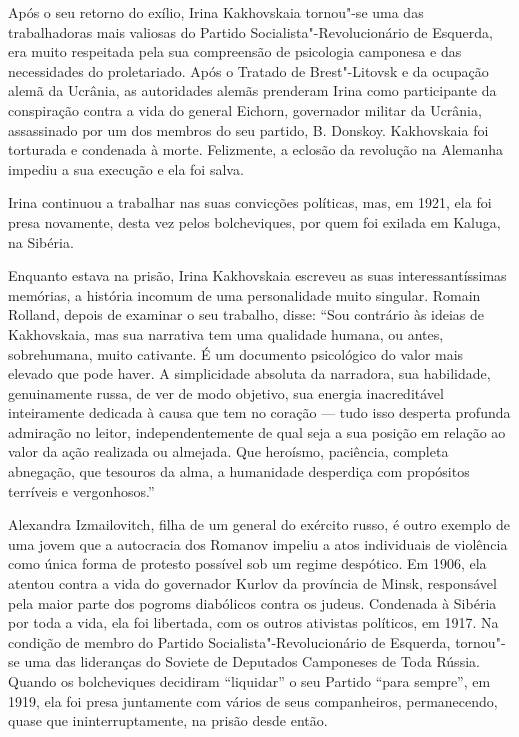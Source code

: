 Após o seu retorno do exílio, Irina Kakhovskaia tornou"-se uma das
trabalhadoras mais valiosas do Partido Socialista"-Revolucionário de
Esquerda, era muito respeitada pela sua compreensão de psicologia
camponesa e das necessidades do proletariado. Após o Tratado de
Brest"-Litovsk e da ocupação alemã da Ucrânia, as autoridades alemãs
prenderam Irina como participante da conspiração contra a vida do
general Eichorn, governador militar da Ucrânia, assassinado por um
dos membros do seu partido, B. Donskoy. Kakhovskaia foi torturada e
condenada à morte. Felizmente, a eclosão da revolução na Alemanha
impediu a sua execução e ela foi salva.

Irina continuou a trabalhar nas suas convicções políticas, mas, em 1921,
ela foi presa novamente, desta vez pelos bolcheviques, por quem foi
exilada em Kaluga, na Sibéria.

Enquanto estava na prisão, Irina Kakhovskaia escreveu as suas
interessantíssimas memórias, a história incomum de uma personalidade
muito singular. Romain Rolland, depois de examinar o seu trabalho,
disse: ``Sou contrário às ideias de Kakhovskaia, mas sua narrativa tem
uma qualidade humana, ou antes, sobrehumana, muito cativante. É um
documento psicológico do valor mais elevado que pode haver. A
simplicidade absoluta da narradora, sua habilidade, genuinamente russa,
de ver de modo objetivo, sua energia inacreditável inteiramente dedicada
à causa que tem no coração --- tudo isso desperta profunda admiração no
leitor, independentemente de qual seja a sua posição em relação ao valor
da ação realizada ou almejada. Que heroísmo, paciência, completa
abnegação, que tesouros da alma, a humanidade desperdiça com propósitos
terríveis e vergonhosos.''

Alexandra Izmailovitch, filha de um general do exército russo, é outro
exemplo de uma jovem que a autocracia dos Romanov impeliu a atos
individuais de violência como única forma de protesto possível sob um
regime despótico. Em 1906, ela atentou contra a vida do governador
Kurlov da província de Minsk, responsável pela maior parte dos pogroms
diabólicos contra os judeus. Condenada à Sibéria por toda a vida, ela
foi libertada, com os outros ativistas políticos, em 1917. Na condição de
membro do Partido Socialista"-Revolucionário de Esquerda, tornou"-se uma
das lideranças do Soviete de Deputados Camponeses de Toda Rússia.
Quando os bolcheviques decidiram ``liquidar'' o seu Partido ``para
sempre'', em 1919, ela foi presa juntamente com vários de seus
companheiros, permanecendo, quase que ininterruptamente, na prisão desde
então.

